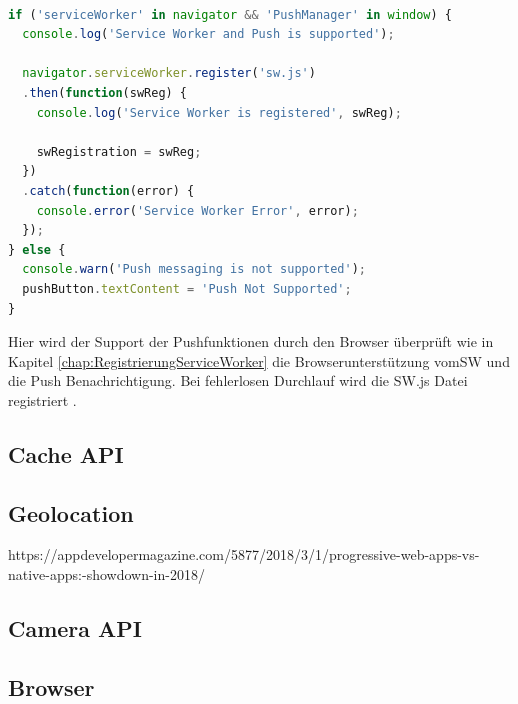 \begin{lstlisting}[language=JavaScript, caption={Push Notifications},label=lst:PushNotifikation, xleftmargin=50pt]

if ('serviceWorker' in navigator && 'PushManager' in window) {
  console.log('Service Worker and Push is supported');

  navigator.serviceWorker.register('sw.js')
  .then(function(swReg) {
    console.log('Service Worker is registered', swReg);

    swRegistration = swReg;
  })
  .catch(function(error) {
    console.error('Service Worker Error', error);
  });
} else {
  console.warn('Push messaging is not supported');
  pushButton.textContent = 'Push Not Supported';
}
\end{lstlisting}


Hier wird der Support der Pushfunktionen durch den Browser überprüft wie in Kapitel \ref{chap:RegistrierungServiceWorker} die Browserunterstützung vom\acs{SW} und die Push Benachrichtigung. Bei fehlerlosen Durchlauf wird die \acs{SW}.js Datei registriert \cite{PushNotifikation}.

\newpage
\subsection{Cache API}

\subsection{Geolocation}
https://appdevelopermagazine.com/5877/2018/3/1/progressive-web-apps-vs-native-apps:-showdown-in-2018/


\subsection{Camera API}


\subsection{Browser} 

